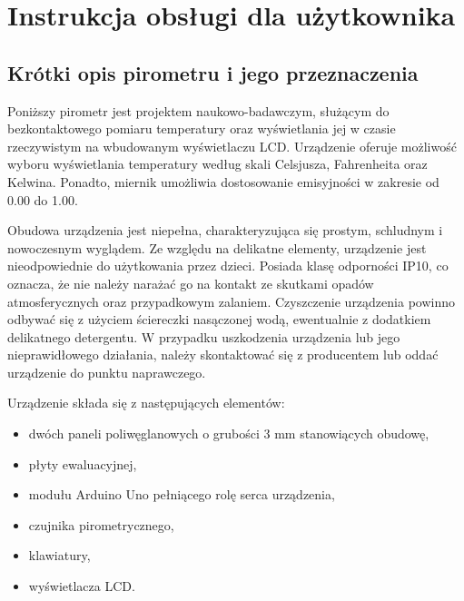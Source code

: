 \chapter{Instrukcja obsługi dla użytkownika}
\section{Krótki opis pirometru i jego przeznaczenia}

Poniższy pirometr jest projektem naukowo-badawczym, służącym do bezkontaktowego pomiaru temperatury oraz wyświetlania jej w czasie rzeczywistym na wbudowanym wyświetlaczu LCD. Urządzenie oferuje możliwość wyboru wyświetlania temperatury według skali Celsjusza, Fahrenheita oraz Kelwina. Ponadto, miernik umożliwia dostosowanie emisyjności w zakresie od 0.00 do 1.00.

\vspace{12pt}

Obudowa urządzenia jest niepełna, charakteryzująca się prostym, schludnym i nowoczesnym wyglądem. Ze względu na delikatne elementy, urządzenie jest nieodpowiednie do użytkowania przez dzieci. Posiada klasę odporności IP10, co oznacza, że nie należy narażać go na kontakt ze skutkami opadów atmosferycznych oraz przypadkowym zalaniem. Czyszczenie urządzenia powinno odbywać się z użyciem ściereczki nasączonej wodą, ewentualnie z dodatkiem delikatnego detergentu. W przypadku uszkodzenia urządzenia lub jego nieprawidłowego działania, należy skontaktować się z producentem lub oddać urządzenie do punktu naprawczego.

\newpage

Urządzenie składa się z następujących elementów:
\begin{itemize}
    \item dwóch paneli poliwęglanowych o grubości 3 mm stanowiących obudowę,
    \item płyty ewaluacyjnej,
    \item modułu Arduino Uno pełniącego rolę serca urządzenia,
    \item czujnika pirometrycznego,
    \item klawiatury,
    \item wyświetlacza LCD.
\end{itemize}

